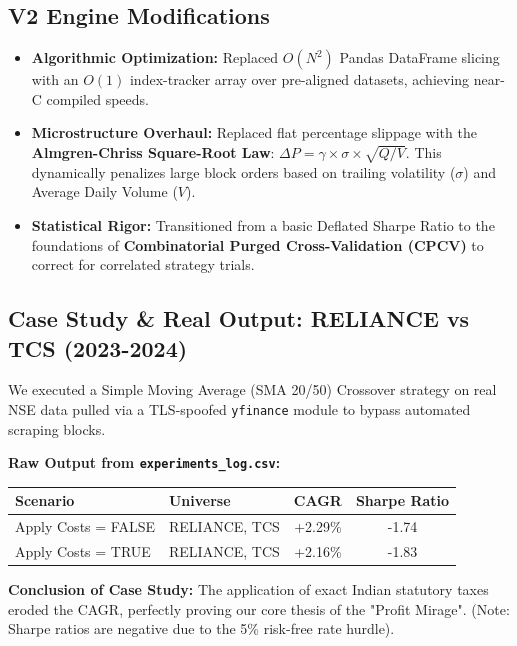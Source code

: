 \documentclass[12pt,a4paper]{article}
\begin{document}
\subsection{V2 Engine Modifications}
\begin{itemize}
    \item \textbf{Algorithmic Optimization:} Replaced $O(N^2)$ Pandas DataFrame slicing with an $O(1)$ index-tracker array over pre-aligned datasets, achieving near-C compiled speeds.
    \item \textbf{Microstructure Overhaul:} Replaced flat percentage slippage with the \textbf{Almgren-Chriss Square-Root Law}: $\Delta P = \gamma \times \sigma \times \sqrt{Q / V}$. This dynamically penalizes large block orders based on trailing volatility ($\sigma$) and Average Daily Volume ($V$).
    \item \textbf{Statistical Rigor:} Transitioned from a basic Deflated Sharpe Ratio to the foundations of \textbf{Combinatorial Purged Cross-Validation (CPCV)} to correct for correlated strategy trials.
\end{itemize}

\subsection{Case Study \& Real Output: RELIANCE vs TCS (2023-2024)}
We executed a Simple Moving Average (SMA 20/50) Crossover strategy on real NSE data pulled via a TLS-spoofed \texttt{yfinance} module to bypass automated scraping blocks.

\vspace{0.5cm}
\textbf{Raw Output from \texttt{experiments\_log.csv}:}
\begin{table}[h]
\centering
\begin{tabular}{@{}llcc@{}}
\toprule
\textbf{Scenario} & \textbf{Universe} & \textbf{CAGR} & \textbf{Sharpe Ratio} \\ \midrule
Apply Costs = FALSE & RELIANCE, TCS & +2.29\% & -1.74 \\
Apply Costs = TRUE & RELIANCE, TCS & +2.16\% & -1.83 \\ \bottomrule
\end{tabular}
\end{table}

\textbf{Conclusion of Case Study:} The application of exact Indian statutory taxes eroded the CAGR, perfectly proving our core thesis of the "Profit Mirage". (Note: Sharpe ratios are negative due to the 5\% risk-free rate hurdle).
\end{document}
